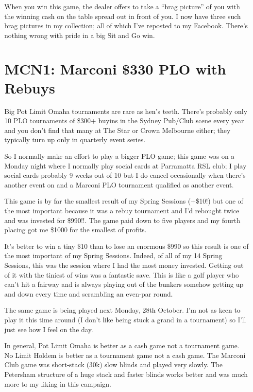 When you win this game, the dealer offers to take a ``brag picture''
of you with the winning cash on the table spread out in front of
you. I now have three such brag pictures in my collection; all of which
I've reposted to my Facebook. There's nothing wrong with
pride in a big Sit and Go win.

\section*{MCN1: Marconi \$330 PLO with Rebuys}

Big Pot Limit Omaha tournaments are rare as hen's teeth. There's
probably only 10 PLO tournaments of \$300+ buyins in the Sydney
Pub/Club scene every year and you don't find that many at The Star or
Crown Melbourne either; they typically turn up only in quarterly event
series.

So I normally make an effort to play a bigger PLO game; this game was
on a Monday night where I normally play social cards at Parramatta RSL
club; I play social cards probably 9 weeks out of 10 but I do cancel
occasionally when there's another event on and a Marconi PLO
tournament qualified as another event.

This game is by far the smallest result of my Spring Sessions (+\$10!)
but one of the most important because it was a rebuy tournament and
I'd rebought twice and was invested for \$990!!. The game paid down to
five players and my fourth placing got me \$1000 for the smallest of
profits.

It's better to win a tiny \$10 than to lose an enormous \$990 so this
result is one of the most important of my Spring Sessions. Indeed,
of all of my 14 Spring Sessions, this was the session where I had the
most money invested. Getting out of it with the tiniest of wins was a
fantastic save. This is like a golf player who can't hit a fairway and
is always playing out of the bunkers somehow getting up and down every
time and scrambling an even-par round.

The same game is being played next Monday, 28th October. I'm not as
keen to play it this time around (I don't like being stuck a grand in
a tournament) so I'll just see how I feel on the day.

In general, Pot Limit Omaha is better as a cash game not a tournament
game. No Limit Holdem is better as a tournament game not a cash game.
The Marconi Club game was short-stack (30k) slow blinds and played
very slowly. The Petersham structure of a huge stack and faster blinds
works better and was much more to my liking in this campaign.

